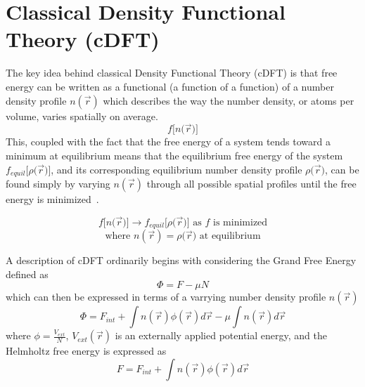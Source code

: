\documentclass[double,12pt]{beavtex}
\begin{document}
\section{Classical Density Functional Theory (cDFT)}

The key idea behind classical Density Functional Theory (cDFT) is that 
free energy can be written as a functional (a function of a function) of 
a number density profile $n(\vec{r})$ which describes the way the number 
density, or atoms per volume, varies spatially on average. 
\begin{displaymath}{f[n(}\vec{r}{)]}\end{displaymath}
This, coupled with the fact that the free energy of a system tends toward 
a minimum at equilibrium means that the equilibrium free energy of the 
system ${f_{equil}}{[}\rho{(}\vec{r}{)]}$, and its corresponding equilibrium 
number density profile $\rho{(}\vec{r}{)}$, can be found simply by varying 
$n(\vec{r})$ through all possible spatial profiles until the free energy 
is minimized~\cite{MoritaDFT}. 

\begin{displaymath}{f[n(}\vec{r}{)]}\rightarrow{f_{equil}}{[}\rho{(}\vec{r}{)]}  \mbox{ as $f$ is minimized} \end{displaymath}
\begin{displaymath}{\mbox{where }  n(\vec{r})=\rho{(}\vec{r})  \mbox{ at equilibrium}}\end{displaymath}


A description of cDFT ordinarily begins with considering the Grand Free 
Energy defined as
\begin{equation}\Phi=F-\mu{N}\end{equation}
which can then be expressed in terms of a varrying number density 
profile $n(\vec r)$
\begin{equation}\label{GrandFE}\Phi= F_{int} +\int n(\vec{r})\phi{(\vec r)}d\vec{r}-\mu\int n(\vec r)d\vec{r}\end{equation}
where $\phi=\frac{V_{ext}}{N}$, $V_{ext}(\vec r)$ is an externally 
applied potential energy, and the Helmholtz free energy is expressed as
\begin{equation}F = F_{int} + \int n(\vec{r})\phi{(\vec r)}d\vec{r}\end{equation}  
\end{document}
